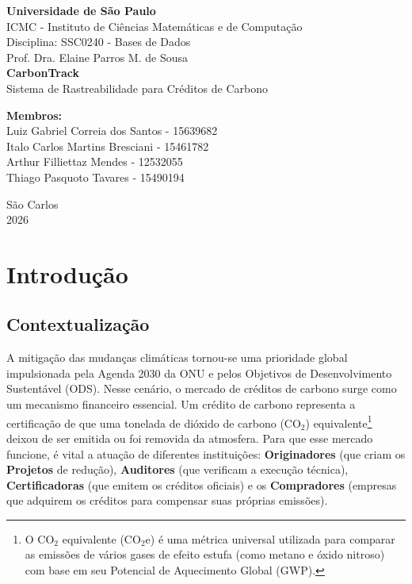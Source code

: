 \documentclass[12pt]{article}
\begin{document}
\begin{titlepage}
    \centering
    \textsf{\large \textbf{Universidade de São Paulo}} \\
    \textsf{\large ICMC - Instituto de Ciências Matemáticas e de Computação} \\
    \vspace{4cm}
    \textsf{\Large Disciplina: SSC0240 - Bases de Dados} \\
    \textsf{\Large Prof. Dra. Elaine Parros M. de Sousa} \\
    \vspace{3cm}
    \textsf{\huge \textbf{CarbonTrack}} \\
    \textsf{\large Sistema de Rastreabilidade para Créditos de Carbono} \\
    \vspace{4cm}
    \begin{flushleft}
        \textbf{Membros:} \\
        Luiz Gabriel Correia dos Santos - 15639682\\
        Italo Carlos Martins Bresciani - 15461782 \\
        Arthur Filliettaz Mendes - 12532055 \\
        Thiago Pasquoto Tavares - 15490194
    \end{flushleft}
    \vfill
    \textsf{São Carlos \\ 2026}
\end{titlepage}

\clearpage
\tableofcontents
\clearpage

\section{Introdução}

\subsection{Contextualização}
A mitigação das mudanças climáticas tornou-se uma prioridade global impulsionada pela Agenda 2030 da ONU e pelos Objetivos de Desenvolvimento Sustentável (ODS). Nesse cenário, o mercado de créditos de carbono surge como um mecanismo financeiro essencial. Um crédito de carbono representa a certificação de que uma tonelada de dióxido de carbono (CO$_2$) equivalente\footnote{O CO$_2$ equivalente (CO$_2$e) é uma métrica universal utilizada para comparar as emissões de vários gases de efeito estufa (como metano e óxido nitroso) com base em seu Potencial de Aquecimento Global (GWP).} deixou de ser emitida ou foi removida da atmosfera. Para que esse mercado funcione, é vital a atuação de diferentes instituições: \textbf{Originadores} (que criam os \textbf{Projetos} de redução), \textbf{Auditores} (que verificam a execução técnica), \textbf{Certificadoras} (que emitem os créditos oficiais) e os \textbf{Compradores} (empresas que adquirem os créditos para compensar suas próprias emissões).
\end{document}
